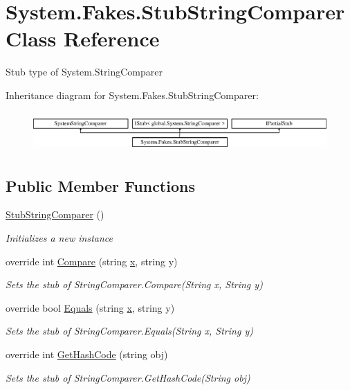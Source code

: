 \hypertarget{class_system_1_1_fakes_1_1_stub_string_comparer}{\section{System.\-Fakes.\-Stub\-String\-Comparer Class Reference}
\label{class_system_1_1_fakes_1_1_stub_string_comparer}
}


Stub type of System.\-String\-Comparer 


Inheritance diagram for System.\-Fakes.\-Stub\-String\-Comparer\-:\begin{figure}[H]
\begin{center}
\leavevmode
\includegraphics[height=1.536351cm]{class_system_1_1_fakes_1_1_stub_string_comparer}
\end{center}
\end{figure}
\subsection*{Public Member Functions}
\begin{DoxyCompactItemize}
\item 
\hyperlink{class_system_1_1_fakes_1_1_stub_string_comparer_ace4c1d47cf461dc1a49e0037c9799059}{Stub\-String\-Comparer} ()
\begin{DoxyCompactList}\small\item\em Initializes a new instance\end{DoxyCompactList}\item 
override int \hyperlink{class_system_1_1_fakes_1_1_stub_string_comparer_a70c09394f5f5f4084170f99350bf6e5c}{Compare} (string \hyperlink{jquery-1_810_82_8min_8js_a5ce50d751c9664d05375c8f5080ed43e}{x}, string y)
\begin{DoxyCompactList}\small\item\em Sets the stub of String\-Comparer.\-Compare(\-String x, String y)\end{DoxyCompactList}\item 
override bool \hyperlink{class_system_1_1_fakes_1_1_stub_string_comparer_a7c4aae270b2ca1aff4f5e92ebfe7d7af}{Equals} (string \hyperlink{jquery-1_810_82_8min_8js_a5ce50d751c9664d05375c8f5080ed43e}{x}, string y)
\begin{DoxyCompactList}\small\item\em Sets the stub of String\-Comparer.\-Equals(\-String x, String y)\end{DoxyCompactList}\item 
override int \hyperlink{class_system_1_1_fakes_1_1_stub_string_comparer_a356a89ece11072e8e0b895b2f797baea}{Get\-Hash\-Code} (string obj)
\begin{DoxyCompactList}\small\item\em Sets the stub of String\-Comparer.\-Get\-Hash\-Code(\-String obj)\end{DoxyCompactList}\end{DoxyCompactItemize}
